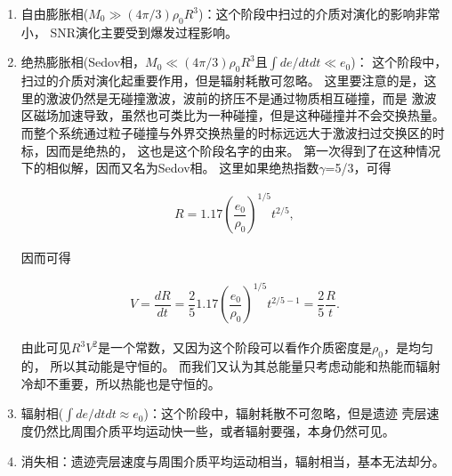 \begin{enumerate}

    \item 自由膨胀相($M_0\gg(4\pi/3)\rho_0R^3$)：这个阶段中扫过的介质对演化的影响非常小，
    SNR演化主要受到爆发过程影响。

    \item 绝热膨胀相(Sedov相，$M_0\ll(4\pi/3)\rho_0R^3$且$\int de/dt dt\ll e_0$)：
    这个阶段中，扫过的介质对演化起重要作用，但是辐射耗散可忽略。
    这里要注意的是，这里的激波仍然是无碰撞激波，波前的挤压不是通过物质相互碰撞，而是
    激波区磁场加速导致，虽然也可类比为一种碰撞，但是这种碰撞并不会交换热量。
    而整个系统通过粒子碰撞与外界交换热量的时标远远大于激波扫过交换区的时标，因而是绝热的，
    这也是这个阶段名字的由来。
    \citet{1959sdmm.book.....S}第一次得到了在这种情况下的相似解，因而又名为Sedov相。
    这里如果绝热指数$\gamma$=5/3，可得

    \begin{equation}
      \begin{aligned}
        R = 1.17\left(\dfrac{e_0}{\rho_0}\right)^{1/5}t^{2/5},
      \end{aligned}
    \end{equation}

    因而可得

    \begin{equation}
      \begin{aligned}
        V = \dfrac{dR}{dt} = \dfrac{2}{5}1.17\left(\dfrac{e_0}{\rho_0}\right)^{1/5}t^{2/5-1} = \dfrac{2}{5}\dfrac{R}{t}.
      \end{aligned}
    \end{equation}

    由此可见$R^3V^2$是一个常数，又因为这个阶段可以看作介质密度是$\rho_0$，是均匀的，
    所以其动能是守恒的。
    而我们又认为其总能量只考虑动能和热能而辐射冷却不重要，所以热能也是守恒的。

    \item 辐射相($\int de/dt dt\approx  e_0$)：这个阶段中，辐射耗散不可忽略，但是遗迹
    壳层速度仍然比周围介质平均运动快一些，或者辐射要强，本身仍然可见。

    \item 消失相：遗迹壳层速度与周围介质平均运动相当，辐射相当，基本无法却分。

\end{enumerate}

